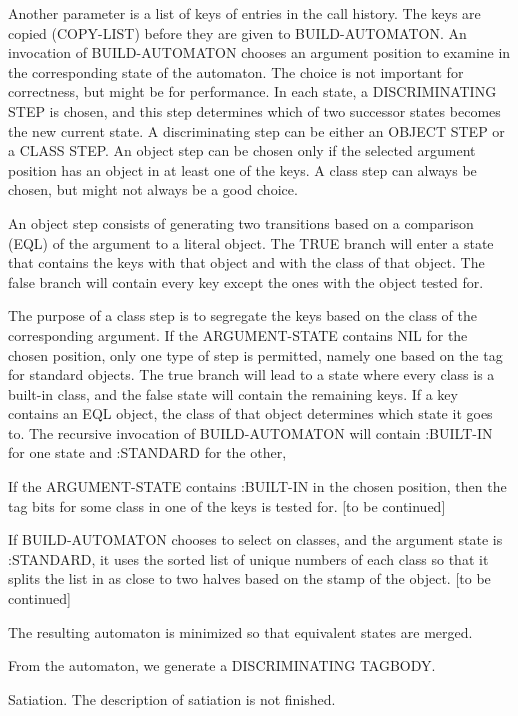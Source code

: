 Another parameter is a list of keys of entries in the call history.
The keys are copied (COPY-LIST) before they are given to
BUILD-AUTOMATON.  An invocation of BUILD-AUTOMATON chooses an argument
position to examine in the corresponding state of the automaton.  The
choice is not important for correctness, but might be for performance.
In each state, a DISCRIMINATING STEP is chosen, and this step
determines which of two successor states becomes the new current
state.  A discriminating step can be either an OBJECT STEP or a CLASS
STEP.  An object step can be chosen only if the selected argument
position has an object in at least one of the keys.  A class step can
always be chosen, but might not always be a good choice.

An object step consists of generating two transitions based on a
comparison (EQL) of the argument to a literal object.  The TRUE branch
will enter a state that contains the keys with that object and with
the class of that object.  The false branch will contain every key
except the ones with the object tested for.

The purpose of a class step is to segregate the keys based on the
class of the corresponding argument.  If the ARGUMENT-STATE contains
NIL for the chosen position, only one type of step is permitted,
namely one based on the tag for standard objects.  The true branch
will lead to a state where every class is a built-in class, and the
false state will contain the remaining keys. If a key contains an
EQL object, the class of that object determines which state it goes
to.  The recursive invocation of BUILD-AUTOMATON will contain
:BUILT-IN for one state and :STANDARD for the other, 

If the ARGUMENT-STATE contains :BUILT-IN in the chosen position, then
the tag bits for some class in one of the keys is tested for. [to be
continued] 

If BUILD-AUTOMATON chooses to select on classes, and the argument
state is :STANDARD, it uses the sorted list of unique numbers of each
class so that it splits the list in as close to two halves based on
the stamp of the object. [to be continued]

The resulting automaton is minimized so that equivalent states are
merged.

From the automaton, we generate a DISCRIMINATING TAGBODY.

Satiation.  The description of satiation is not finished.

